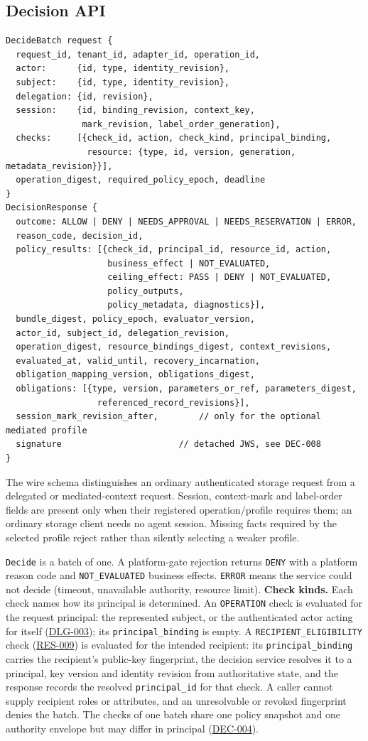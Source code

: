 \documentclass[11pt,a4paper]{article}
\newcommand{\code}[1]{{\small\nolinkurl{#1}}}
\newcommand{\rr}[1]{\hyperlink{req:#1}{#1}}
\begin{document}
\subsection{Decision API}\label{sec:decisionapi}
\begin{lstlisting}
DecideBatch request {
  request_id, tenant_id, adapter_id, operation_id,
  actor:      {id, type, identity_revision},
  subject:    {id, type, identity_revision},
  delegation: {id, revision},
  session:    {id, binding_revision, context_key,
               mark_revision, label_order_generation},
  checks:     [{check_id, action, check_kind, principal_binding,
                resource: {type, id, version, generation, metadata_revision}}],
  operation_digest, required_policy_epoch, deadline
}
DecisionResponse {
  outcome: ALLOW | DENY | NEEDS_APPROVAL | NEEDS_RESERVATION | ERROR,
  reason_code, decision_id,
  policy_results: [{check_id, principal_id, resource_id, action,
                    business_effect | NOT_EVALUATED,
                    ceiling_effect: PASS | DENY | NOT_EVALUATED,
                    policy_outputs,
                    policy_metadata, diagnostics}],
  bundle_digest, policy_epoch, evaluator_version,
  actor_id, subject_id, delegation_revision,
  operation_digest, resource_bindings_digest, context_revisions,
  evaluated_at, valid_until, recovery_incarnation,
  obligation_mapping_version, obligations_digest,
  obligations: [{type, version, parameters_or_ref, parameters_digest,
                  referenced_record_revisions}],
  session_mark_revision_after,        // only for the optional mediated profile
  signature                       // detached JWS, see DEC-008
}
\end{lstlisting}
The wire schema distinguishes an ordinary authenticated storage request from a delegated or mediated-context request. Session, context-mark and label-order fields are present only when their registered operation/profile requires them; an ordinary storage client needs no agent session. Missing facts required by the selected profile reject rather than silently selecting a weaker profile.

\code{Decide} is a batch of one. A platform-gate rejection returns \code{DENY} with a platform reason code and \code{NOT_EVALUATED} business effects. \code{ERROR} means the service could not decide (timeout, unavailable authority, resource limit).
\textbf{Check kinds.} Each check names how its principal is determined. An \code{OPERATION} check is evaluated for the request principal: the represented subject, or the authenticated actor acting for itself (\rr{DLG-003}); its \code{principal_binding} is empty. A \code{RECIPIENT_ELIGIBILITY} check (\rr{RES-009}) is evaluated for the intended recipient: its \code{principal_binding} carries the recipient's public-key fingerprint, the decision service resolves it to a principal, key version and identity revision from authoritative state, and the response records the resolved \code{principal_id} for that check. A caller cannot supply recipient roles or attributes, and an unresolvable or revoked fingerprint denies the batch. The checks of one batch share one policy snapshot and one authority envelope but may differ in principal (\rr{DEC-004}).
\end{document}

